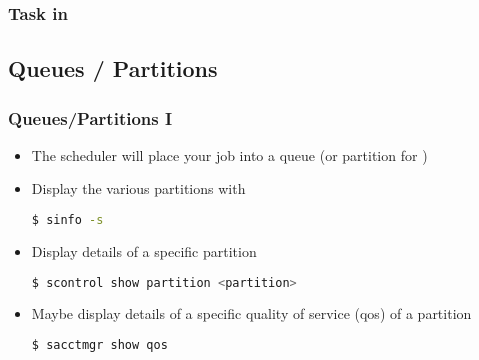 \begin{frame}
  \frametitle{Task in \slurm}
  \pause
  \vfill
\end{frame}


\subsection*{Queues / Partitions}

\begin{frame}[fragile]
  \frametitle{Queues/Partitions I}
  \begin{itemize}
  \item The scheduler will place your job into a queue (or partition for \slurm)
  \item Display the various partitions with
  \begin{lstlisting}[language=Bash, style=Shell]
$ sinfo -s
  \end{lstlisting}
\item Display details of a specific partition
  \begin{lstlisting}[language=Bash, style=Shell]
$ scontrol show partition <partition>
  \end{lstlisting}
  \item Maybe display details of a specific quality of service (qos) of a partition
  \begin{lstlisting}[language=Bash, style=Shell]
$ sacctmgr show qos
  \end{lstlisting}
  \end{itemize}
  \vfill
\end{frame}

